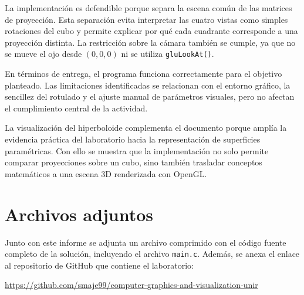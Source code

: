 \documentclass[12pt,a4paper]{article}
\begin{document}
La implementación es defendible porque separa la escena común de las matrices de proyección. Esta separación evita interpretar las cuatro vistas como simples rotaciones del cubo y permite explicar por qué cada cuadrante corresponde a una proyección distinta. La restricción sobre la cámara también se cumple, ya que no se mueve el ojo desde $(0,0,0)$ ni se utiliza \texttt{gluLookAt()}.

En términos de entrega, el programa funciona correctamente para el objetivo planteado. Las limitaciones identificadas se relacionan con el entorno gráfico, la sencillez del rotulado y el ajuste manual de parámetros visuales, pero no afectan el cumplimiento central de la actividad.

La visualización del hiperboloide complementa el documento porque amplía la evidencia práctica del laboratorio hacia la representación de superficies paramétricas. Con ello se muestra que la implementación no solo permite comparar proyecciones sobre un cubo, sino también trasladar conceptos matemáticos a una escena 3D renderizada con OpenGL.

\section{Archivos adjuntos}

Junto con este informe se adjunta un archivo comprimido con el código fuente completo de la solución, incluyendo el archivo \texttt{main.c}. Además, se anexa el enlace al repositorio de GitHub que contiene el laboratorio:

\begin{center}
\href{https://github.com/smaje99/computer-graphics-and-visualization-unir}{https://github.com/smaje99/computer-graphics-and-visualization-unir}
\end{center}
\end{document}
